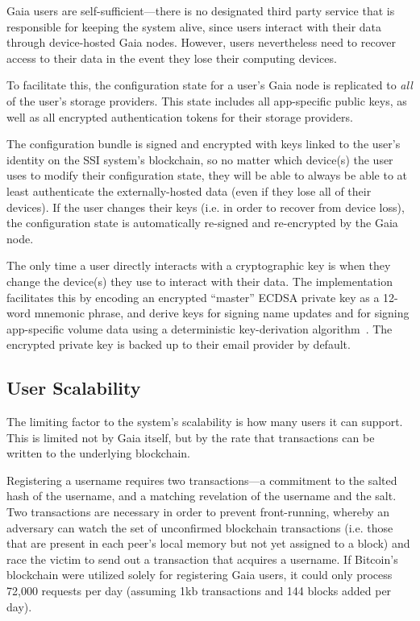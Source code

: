 Gaia users are self-sufficient---there is no designated third party service that is
responsible for keeping the system alive, since users interact with their data
through device-hosted Gaia nodes.  However, users nevertheless need to recover
access to their data in the event they lose their computing devices.

To facilitate this, the configuration state for a user's Gaia node is replicated to \textit{all} of
the user's storage providers.  This state includes all app-specific public keys,
as well as all encrypted authentication tokens for their storage providers.

The configuration bundle is signed and encrypted with keys linked to
the user's identity on the SSI system's blockchain, so no matter which device(s) the user
uses to modify their configuration state, they will be able to always be able to
at least authenticate the externally-hosted data (even if they lose all of their
devices).  If the user changes their keys (i.e. in order to recover from device
loss), the configuration state is
automatically re-signed and re-encrypted by the Gaia node.

The only time a user directly interacts with a cryptographic key is when they
change the device(s) they use to interact with their data.
The implementation facilitates this by
encoding an encrypted ``master'' ECDSA private key as a 12-word mnemonic phrase, and derive keys
for signing name updates and for signing app-specific volume data
using a deterministic key-derivation
algorithm~\cite{bip39}.  The encrypted private key is backed up to their email provider by
default.

\subsection{User Scalability}

The limiting factor to the system's scalability is how many users it can support.
This is limited not by Gaia itself, but by the rate that transactions can be
written to the underlying blockchain.

Registering a username requires two
transactions---a commitment to the salted hash of the username, and a matching
revelation of the username and the salt.  Two transactions are necessary in
order to prevent front-running, whereby an adversary can watch the set of
unconfirmed blockchain transactions (i.e. those that are present in each peer's
local memory but not yet assigned to a block) and race the victim to send out
a transaction that acquires a username.  If Bitcoin's blockchain were utilized
solely for registering Gaia users, it could only process 72,000 requests per day
(assuming 1kb transactions and 144 blocks added per day).


